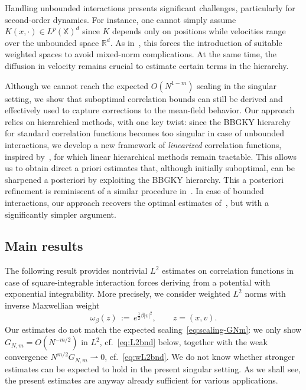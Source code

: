 \documentclass[a4paper,11pt,reqno,noindent]{amsart}
\theoremstyle{plain}
\theoremstyle{definition}
\numberwithin{equation}{section}
\newcommand{\Xd}{\mathbb X}
\newcommand{\R}{\mathbb R}
\begin{document}
Handling unbounded interactions presents significant challenges, particularly for second-order dynamics. For instance, one cannot simply assume $K(x,\cdot)\in L^p(\Xd)^d$ since $K$ depends only on positions while velocities range over the unbounded space $\R^d$. As in~\cite{BJS-22}, this forces the introduction of suitable weighted spaces to avoid mixed-norm complications. At the same time, the diffusion in velocity remains crucial to estimate certain terms in the hierarchy.

Although we cannot reach the expected $O(N^{1-m})$ scaling in the singular setting, we show that suboptimal correlation bounds can still be derived and effectively used to capture corrections to the mean-field behavior. Our approach relies on hierarchical methods, with one key twist: since the BBGKY hierarchy for standard correlation functions becomes too singular in case of unbounded interactions, we develop a new framework of {\it linearized} correlation functions, inspired by~\cite{BDJ-24,BDM_25}, for which linear hierarchical methods remain tractable. This allows us to obtain direct a priori estimates that, although initially suboptimal, can be sharpened a posteriori by exploiting the BBGKY hierarchy. This a posteriori refinement is reminiscent of a similar procedure in~\cite{BDM_25}. In case of bounded interactions, our approach recovers the optimal estimates of~\cite{Hess_Childs_2023}, but with a significantly simpler argument.


\subsection{Main results}

The following result provides nontrivial $L^2$ estimates on correlation functions in case of square-integrable interaction forces deriving from a potential with exponential integrability. More precisely, we consider weighted $L^2$ norms with inverse Maxwellian weight
\[\omega_\beta(z)\,:=\,e^{\frac12\beta|v|^2},\qquad z=(x,v).\]
Our estimates do not match the expected scaling~\eqref{eq:scaling-GNm}: we only show $G_{N,m}=O(N^{-m/2})$ in $L^2$, cf.~\eqref{eq:L2bnd} below, together with the weak convergence $N^{m/2}G_{N,m}\rightharpoonup0$, cf.~\eqref{eq:wL2bnd}. We do not know whether stronger estimates can be expected to hold in the present singular setting. As we shall see, the present estimates are anyway already sufficient for various applications.
\end{document}

